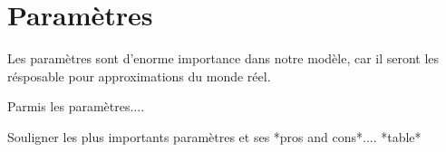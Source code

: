 \section{Paramètres}

Les paramètres sont d'enorme importance dans notre modèle, car il seront les résposable pour approximations du monde réel.

Parmis les paramètres....

Souligner les plus importants paramètres et ses *pros and cons*.... *table*
